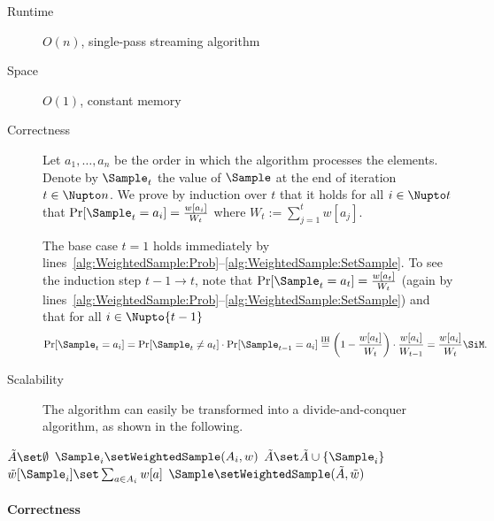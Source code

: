 \begin{description}
	\item[Runtime] $O(n)$, single-pass streaming algorithm
	\item[Space] $O(1)$, constant memory
	\item[Correctness]
		Let $a_1, \dots, a_n$ be the order in which the algorithm processes the elements. Denote by $\Sample_t$ the value of $\Sample$ at the end of iteration $t \in \Nupto n$. We prove by induction over $t$ that it holds for all $i \in \Nupto t$ that $\Pr[\Sample_t = a_i] = \frac{w[a_i]}{W_t}$ where $W_t := \sum_{j=1}^t w[a_j]$.

		The base case $t = 1$ holds immediately by lines~\ref{alg:WeightedSample:Prob}--\ref{alg:WeightedSample:SetSample}. To see the induction step $t - 1 \to t$, note that $\Pr[\Sample_t = a_t] = \frac{w[a_t]}{W_t}$ (again by lines~\ref{alg:WeightedSample:Prob}--\ref{alg:WeightedSample:SetSample}) and that for all $i \in \Nupto{t-1}$
		\begin{align*}
			\Pr[\Sample_t = a_i]
			=	\Pr[\Sample_t \neq a_t] \cdot \Pr[\Sample_{t-1} = a_i]
			\stackrel{\text{IH}}{=}
				\left(1 - \frac{w[a_t]}{W_t}\right) \cdot \frac{w[a_i]}{W_{t-1}}
			=	\frac{w[a_i]}{W_t}
			\SiM.
		\end{align*}
	\item[Scalability]
		The algorithm can easily be transformed into a divide-and-conquer algorithm, as shown in the following.
\end{description}

\begin{algorithm}[RecursiveWeightedSample$(A_1, A_2, w)$] \label{alg:RecursiveWeightedSample}
\begin{algorithmic}[1]
	\State $\tilde A \set \emptyset$
		\State $\Sample_i \set \texttt{WeightedSample}(A_i, w)$
		\State $\tilde A \set \tilde A \cup \{ \Sample_i \}$
		\State $\tilde w[\Sample_i] \set \sum_{a \in A_i} w[a]$
	\EndFor
	\State $\Sample \set \texttt{WeightedSample}(\tilde A, \tilde w)$
\end{algorithmic}
\end{algorithm}

\paragraph{Correctness}

